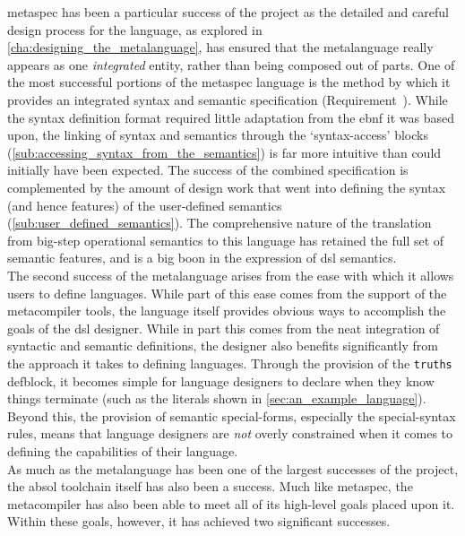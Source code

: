 \gls{metaspec} has been a particular success of the project as the detailed and careful design process for the language, as explored in \autoref{cha:designing_the_metalanguage}, has ensured that the metalanguage really appears as one \textit{integrated} entity, rather than being composed out of parts.
One of the most successful portions of the metaspec language is the method by which it provides an integrated syntax and semantic specification (Requirement~).
While the syntax definition format required little adaptation from the \gls{ebnf} it was based upon, the linking of syntax and semantics through the `syntax-access' blocks (\autoref{sub:accessing_syntax_from_the_semantics}) is far more intuitive than could initially have been expected. 
The success of the combined specification is complemented by the amount of design work that went into defining the syntax (and hence features) of the user-defined semantics (\autoref{sub:user_defined_semantics}).
The comprehensive nature of the translation from big-step operational semantics to this language has retained the full set of semantic features, and is a big boon in the expression of \gls{dsl} semantics.\\

The second success of the metalanguage arises from the ease with which it allows users to define languages. 
While part of this ease comes from the support of the metacompiler tools, the language itself provides obvious ways to accomplish the goals of the \gls{dsl} designer. 
While in part this comes from the neat integration of syntactic and semantic definitions, the designer also benefits significantly from the approach it takes to defining languages. 
Through the provision of the \texttt{truths} defblock, it becomes simple for language designers to declare when they know things terminate (such as the literals shown in \autoref{sec:an_example_language}).
Beyond this, the provision of semantic special-forms, especially the special-syntax rules, means that language designers are \textit{not} overly constrained when it comes to defining the capabilities of their language.\\

As much as the metalanguage has been one of the largest successes of the project, the \gls{absol} toolchain itself has also been a success. 
Much like \gls{metaspec}, the metacompiler has also been able to meet all of its high-level goals placed upon it.
Within these goals, however, it has achieved two significant successes.\\

